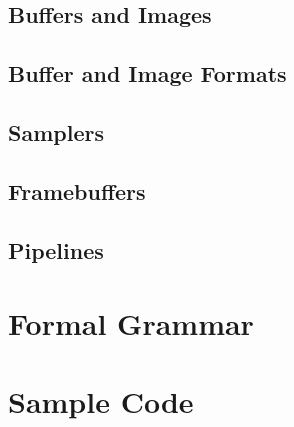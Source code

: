 \documentclass[11pt]{article}
\begin{document}
\subsection{Buffers and Images}

\subsection{Buffer and Image Formats}

\subsection{Samplers}

\subsection{Framebuffers}

\subsection{Pipelines}

\section{Formal Grammar}

\section{Sample Code}
\end{document}
